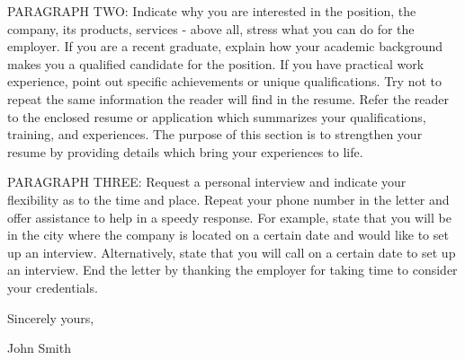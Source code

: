 \documentclass{article}
\begin{document}
PARAGRAPH TWO: Indicate why you are interested in the position, the company, its products, services - above all, stress what you can do for the employer. If you are a recent graduate, explain how your academic background makes you a qualified candidate for the position. If you have practical work experience, point out specific achievements or unique qualifications. Try not to repeat the same information the reader will find in the resume. Refer the reader to the enclosed resume or application which summarizes your qualifications, training, and experiences. The purpose of this section is to strengthen your resume by providing details which bring your experiences to life. 
 
PARAGRAPH THREE: Request a personal interview and indicate your flexibility as to the time and place. Repeat your phone number in the letter and offer assistance to help in a speedy response. For example, state that you will be in the city where the company is located on a certain date and would like to set up an interview. Alternatively, state that you will call on a certain date to set up an interview. End the letter by thanking the employer for taking time to consider your credentials. 

\bigskip %

Sincerely yours,

\vspace{50pt} %

John Smith
\end{document}
